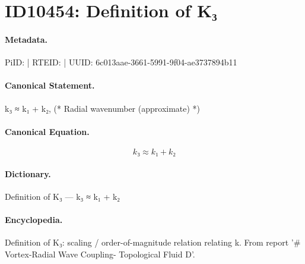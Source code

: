 \section*{ID10454: Definition of K₃}
\paragraph{Metadata.}
PiID:  | RTEID:  | UUID: 6c013aae-3661-5991-9f04-ae3737894b11

\paragraph{Canonical Statement.}
k₃ ≈ k₁ + k₂, (* Radial wavenumber (approximate) *)

\paragraph{Canonical Equation.}
\[
k₃ ≈ k₁ + k₂
\]

\paragraph{Dictionary.}
Definition of K₃ — k₃ ≈ k₁ + k₂

\paragraph{Encyclopedia.}
Definition of K₃: scaling / order-of-magnitude relation relating k. From report '\# Vortex-Radial Wave Coupling- Topological Fluid D'.
